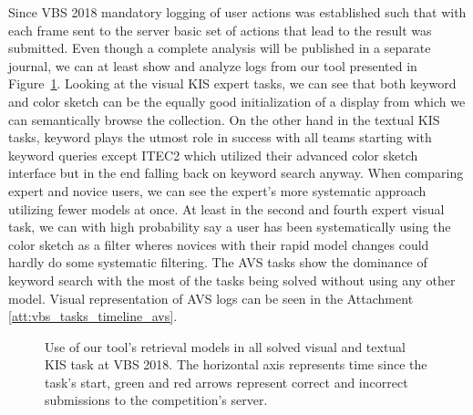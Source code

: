 Since VBS 2018 mandatory logging of user actions was established such that with each frame sent to the server basic set of actions that lead to the result was submitted. Even though a complete analysis will be published in a separate journal, we can at least show and analyze logs from our tool presented in Figure~\ref{fig:vbs_tasks_timeline}. Looking at the visual KIS expert tasks, we can see that both keyword and color sketch can be the equally good initialization of a display from which we can semantically browse the collection. On the other hand in the textual KIS tasks, keyword plays the utmost role in success with all teams starting with keyword queries except ITEC2 which utilized their advanced color sketch interface but in the end falling back on keyword search anyway. When comparing expert and novice users, we can see the expert's more systematic approach utilizing fewer models at once. At least in the second and fourth expert visual task, we can with high probability say a user has been systematically using the color sketch as a filter wheres novices with their rapid model changes could hardly do some systematic filtering. The AVS tasks show the dominance of keyword search with the most of the tasks being solved without using any other model. Visual representation of AVS logs can be seen in the Attachment \ref{att:vbs_tasks_timeline_avs}.

\begin{figure}
	\centering
	
	
	\caption[Use of tool's retrieval models in KIS tasks]{Use of our tool's retrieval models in all solved visual and textual KIS task at VBS 2018. The horizontal axis represents time since the task's start, green and red arrows represent correct and incorrect submissions to the competition's server.}
	\label{fig:vbs_tasks_timeline}
\end{figure}
